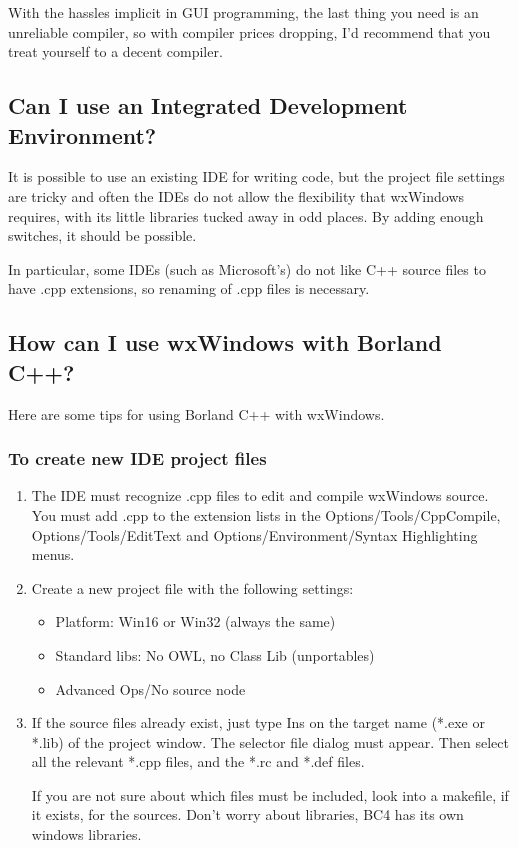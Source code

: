 With the hassles implicit in GUI programming, the last thing you need is
an unreliable compiler, so with compiler prices dropping, I'd recommend
that you treat yourself to a decent compiler.

\subsection{Can I use an Integrated Development Environment?}\label{ide}

It is possible to use an existing IDE for writing code, but the
project file settings are tricky and often the IDEs do not allow
the flexibility that wxWindows requires, with its little libraries
tucked away in odd places. By adding enough switches, it should be
possible.

In particular, some IDEs (such as Microsoft's) do not like C++ source
files to have .cpp extensions, so renaming of .cpp files is necessary.


\subsection{How can I use wxWindows with Borland C++?}

Here are some tips for using Borland C++ with wxWindows.

\subsubsection{To create new IDE project files}

\begin{enumerate}
\item The IDE must recognize .cpp files to edit and compile wxWindows
source. You must add .cpp to the extension lists in the
Options/Tools/CppCompile, Options/Tools/EditText and
Options/Environment/Syntax Highlighting menus.
\item Create a new project file with the following settings:
\begin{itemize}
\item Platform: Win16 or Win32 (always the same)
\item Standard libs: No OWL, no Class Lib (unportables)
\item Advanced Ops/No source node
\end{itemize}
\item If the source files already exist, just type Ins on the target name
(*.exe or *.lib) of the project window. The selector file dialog must
appear. Then select all the relevant *.cpp files, and the *.rc and 
*.def files. 

If you are not sure about which files must be included, look into a
makefile, if it exists, for the sources. Don't worry about libraries,
BC4 has its own windows libraries.
\end{enumerate}

